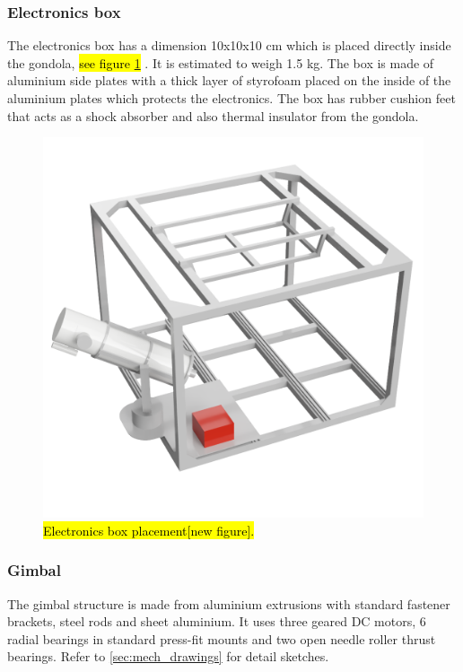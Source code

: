 \subsubsection{Electronics box}
\label{sec:4.4.2}


The electronics box has a dimension 10x10x10 cm which is placed directly inside the gondola, \hl{see figure {\ref{fig::mechanical::ebox}}} . It is estimated to weigh 1.5 kg. The box is made of aluminium side plates with a thick layer of styrofoam placed on the inside of the aluminium plates which protects the electronics. The box has rubber cushion feet that acts as a shock absorber and also thermal insulator from the gondola.

\begin{figure}[H]
	\centering 
	\includegraphics[scale=0.4]{4-experiment-design/img/mechanical/ebox.png}
	\caption{\hl{Electronics box placement[new figure].}}
	\label{fig::mechanical::ebox}
\end{figure}


\subsubsection{Gimbal}
\label {sec:4.4.3}

The gimbal structure is made from aluminium extrusions with standard fastener brackets, steel rods and sheet aluminium. It uses three geared DC motors, 6 radial bearings in standard press-fit mounts and two open needle roller thrust bearings. Refer to \ref{sec:mech_drawings} for detail sketches. 

